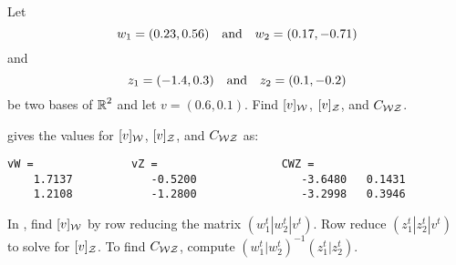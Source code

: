 \documentclass{ximera}
\begin{document}
\begin{exercise} \label{c7.1.5}
Let
\[
w_1 = (0.23,0.56) \quad\mbox{and}\quad w_2 = (0.17,-0.71)
\]
and
\[
z_1 = (-1.4,0.3) \quad\mbox{and}\quad z_2 = (0.1,-0.2)
\]
be two bases of $\mbox{$\Bbb{R}$}^2$ and let $v=(0.6,0.1)$.  Find $[v]_{\cal
W}$, $[v]_{\cal Z}$, and $C_{\cal WZ}$.

\begin{solution}

\ans \Matlab gives the values for $[v]_{\cal W}$, $[v]_{\cal Z}$, and
$C_{\cal WZ}$ as:
\begin{verbatim}
vW =               vZ =                   CWZ =
    1.7137            -0.5200                -3.6480   0.1431
    1.2108            -1.2800                -3.2998   0.3946
\end{verbatim}

\soln In \Matlabp, find $[v]_{\cal W}$ by row reducing
the matrix $(w_1^t|w_2^t | v^t)$.  Row reduce 
$(z_1^t|z_2^t | v^t)$ to solve for $[v]_{\cal Z}$.  To find
$C_{\cal WZ}$, compute $(w_1^t|w_2^t)^{-1}(z_1^t|z_2^t)$.

\end{solution}
\end{exercise}
\end{document}
